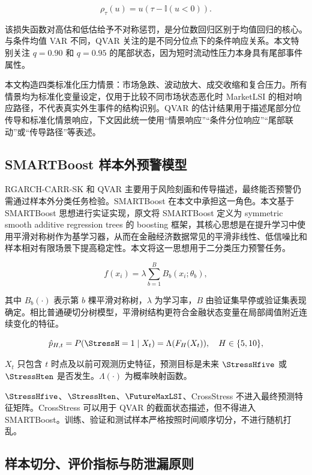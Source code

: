 \begin{equation}
\rho_{\tau}(u)=u\left(\tau-\mathbb{I}(u<0)\right).
\end{equation}

该损失函数对高估和低估给予不对称惩罚，是分位数回归区别于均值回归的核心。与条件均值 VAR 不同，QVAR 关注的是不同分位点下的条件响应关系。本文特别关注 $q=0.90$ 和 $q=0.95$ 的尾部状态，因为短时流动性压力本身具有尾部事件属性。

本文构造四类标准化压力情景：市场急跌、波动放大、成交收缩和复合压力。所有情景均为标准化变量设定，仅用于比较不同市场状态恶化时 MarketLSI 的相对响应路径，不代表真实外生事件的结构识别。QVAR 的估计结果用于描述尾部分位传导和标准化情景响应，下文因此统一使用“情景响应”“条件分位响应”“尾部联动”或“传导路径”等表述。

\subsection{SMARTBoost 样本外预警模型}

RGARCH-CARR-SK 和 QVAR 主要用于风险刻画和传导描述，最终能否预警仍需通过样本外分类任务检验。SMARTBoost 在本文中承担这一角色。本文基于 SMARTBoost 思想进行实证实现，原文将 SMARTBoost 定义为 symmetric smooth additive regression trees 的 boosting 框架，其核心思想是在提升学习中使用平滑对称树作为基学习器，从而在金融经济数据常见的平滑非线性、低信噪比和样本相对有限场景下提高稳定性。本文将这一思想用于二分类压力预警任务。

\begin{equation}
f(x_i)
=
\lambda
\sum_{b=1}^{B}
B_b(x_i;\theta_b),
\end{equation}

其中 $B_b(\cdot)$ 表示第 $b$ 棵平滑对称树，$\lambda$ 为学习率，$B$ 由验证集早停或验证集表现确定。相比普通硬切分树模型，平滑树结构更符合金融状态变量在局部阈值附近连续变化的特征。

\begin{equation}
\hat p_{H,t}
=
P(\StressH=1\mid X_t)
=
\Lambda(F_H(X_t)),
\quad
H\in\{5,10\},
\end{equation}

$X_t$ 只包含 $t$ 时点及以前可观测历史特征，预测目标是未来 \(\StressHfive\) 或 \(\StressHten\) 是否发生。$\Lambda(\cdot)$ 为概率映射函数。

\(\StressHfive\)、\(\StressHten\)、\(\FutureMaxLSI\)、CrossStress 不进入最终预测特征矩阵。CrossStress 可以用于 QVAR 的截面状态描述，但不得进入 SMARTBoost。训练、验证和测试样本严格按照时间顺序切分，不进行随机打乱。

\subsection{样本切分、评价指标与防泄漏原则}

